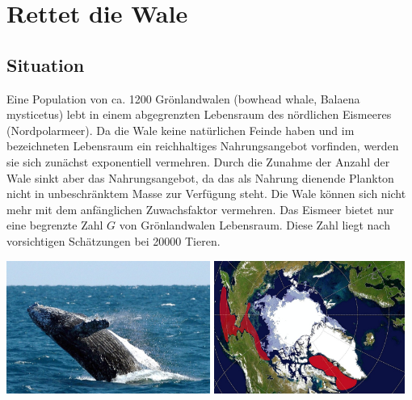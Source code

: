 \documentclass[%
11pt,%
twoside,%
titlepage,%
german,%
headsepline%
]{scrartcl}
\begin{document}
\clearpage

\appendix

\section{Rettet die Wale}\label{anhang:wale}
\subsection{Situation}
Eine
Population von ca. 1200 Grönlandwalen (bowhead whale, Balaena mysticetus) lebt in einem abgegrenzten Lebensraum des nördlichen Eismeeres (Nordpolarmeer). Da die Wale keine natürlichen Feinde haben und im bezeichneten Lebensraum ein reichhaltiges Nahrungsangebot vorfinden, werden sie sich zunächst exponentiell vermehren. Durch die Zunahme der Anzahl der Wale sinkt aber das Nahrungsangebot, da das als Nahrung dienende Plankton nicht in unbeschränktem Masse zur Verfügung steht. Die Wale können sich nicht mehr mit dem anfänglichen Zuwachsfaktor vermehren. Das Eismeer bietet nur eine begrenzte Zahl $G$ von Grönlandwalen Lebensraum. Diese Zahl liegt nach vorsichtigen Schätzungen bei 20000 Tieren.\\[2ex]

\begin{center}
\includegraphics[width=0.5\textwidth]{pictures/groenlandwale.jpeg}
\includegraphics[width=0.4685\textwidth]{pictures/groenlandwalegebiet.jpg}
\end{center}
\end{document}
